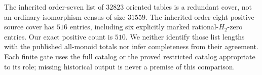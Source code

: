 \begin{remark*}
The inherited order-seven list of $32823$ oriented tables is a
redundant cover, not an ordinary-isomorphism census of size
$31559$. The inherited order-eight positive-source cover has
$516$ entries, including six explicitly marked rational-$H_2$-zero
entries. Our exact positive count is $510$. We neither identify
those list lengths with the published all-monoid totals nor infer
completeness from their agreement. Each finite gate uses the full
catalog or the proved restricted catalog appropriate to its role;
missing historical output is never a premise of this comparison.
\end{remark*}
